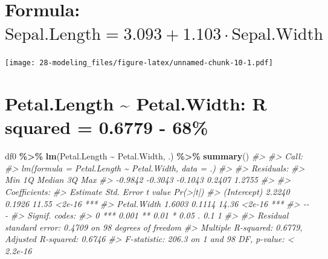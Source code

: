 \documentclass[
  xelatex, ja=standard]{bxjsbook}
\newenvironment{Shaded}{\begin{snugshade}}{\end{snugshade}}
\newcommand{\CommentTok}[1]{\textcolor[rgb]{0.56,0.35,0.01}{\textit{#1}}}
\newcommand{\FunctionTok}[1]{\textcolor[rgb]{0.13,0.29,0.53}{\textbf{#1}}}
\newcommand{\NormalTok}[1]{#1}
\newcommand{\SpecialCharTok}[1]{\textcolor[rgb]{0.81,0.36,0.00}{\textbf{#1}}}
\theoremstyle{definition}
\theoremstyle{definition}
\theoremstyle{definition}
\theoremstyle{definition}
\theoremstyle{remark}
\begin{document}
\hypertarget{formula-textsepal.length-3.093-1.103cdot-textsepal.width}{%
\section{\texorpdfstring{Formula: \(\text{Sepal.Length} = 3.093 + 1.103\cdot \text{Sepal.Width}\)}{Formula: \textbackslash text\{Sepal.Length\} = 3.093 + 1.103\textbackslash cdot \textbackslash text\{Sepal.Width\}}}\label{formula-textsepal.length-3.093-1.103cdot-textsepal.width}}

\texttt{[image: 28-modeling\_files/figure-latex/unnamed-chunk-10-1.pdf]}

\hypertarget{petal.length-petal.width-r-squared-0.6779---68}{%
\section{Petal.Length \textasciitilde{} Petal.Width: R squared = 0.6779 - 68\%}\label{petal.length-petal.width-r-squared-0.6779---68}}

\begin{Shaded}
\begin{Highlighting}[]
\NormalTok{df0 }\SpecialCharTok{\%\textgreater{}\%} \FunctionTok{lm}\NormalTok{(Petal.Length }\SpecialCharTok{\textasciitilde{}}\NormalTok{ Petal.Width, .) }\SpecialCharTok{\%\textgreater{}\%} \FunctionTok{summary}\NormalTok{()}
\CommentTok{\#\textgreater{} }
\CommentTok{\#\textgreater{} Call:}
\CommentTok{\#\textgreater{} lm(formula = Petal.Length \textasciitilde{} Petal.Width, data = .)}
\CommentTok{\#\textgreater{} }
\CommentTok{\#\textgreater{} Residuals:}
\CommentTok{\#\textgreater{}     Min      1Q  Median      3Q     Max }
\CommentTok{\#\textgreater{} {-}0.9842 {-}0.3043 {-}0.1043  0.2407  1.2755 }
\CommentTok{\#\textgreater{} }
\CommentTok{\#\textgreater{} Coefficients:}
\CommentTok{\#\textgreater{}             Estimate Std. Error t value Pr(\textgreater{}|t|)    }
\CommentTok{\#\textgreater{} (Intercept)   2.2240     0.1926   11.55   \textless{}2e{-}16 ***}
\CommentTok{\#\textgreater{} Petal.Width   1.6003     0.1114   14.36   \textless{}2e{-}16 ***}
\CommentTok{\#\textgreater{} {-}{-}{-}}
\CommentTok{\#\textgreater{} Signif. codes:  }
\CommentTok{\#\textgreater{} 0 \textquotesingle{}***\textquotesingle{} 0.001 \textquotesingle{}**\textquotesingle{} 0.01 \textquotesingle{}*\textquotesingle{} 0.05 \textquotesingle{}.\textquotesingle{} 0.1 \textquotesingle{} \textquotesingle{} 1}
\CommentTok{\#\textgreater{} }
\CommentTok{\#\textgreater{} Residual standard error: 0.4709 on 98 degrees of freedom}
\CommentTok{\#\textgreater{} Multiple R{-}squared:  0.6779, Adjusted R{-}squared:  0.6746 }
\CommentTok{\#\textgreater{} F{-}statistic: 206.3 on 1 and 98 DF,  p{-}value: \textless{} 2.2e{-}16}
\end{Highlighting}
\end{Shaded}
\end{document}
